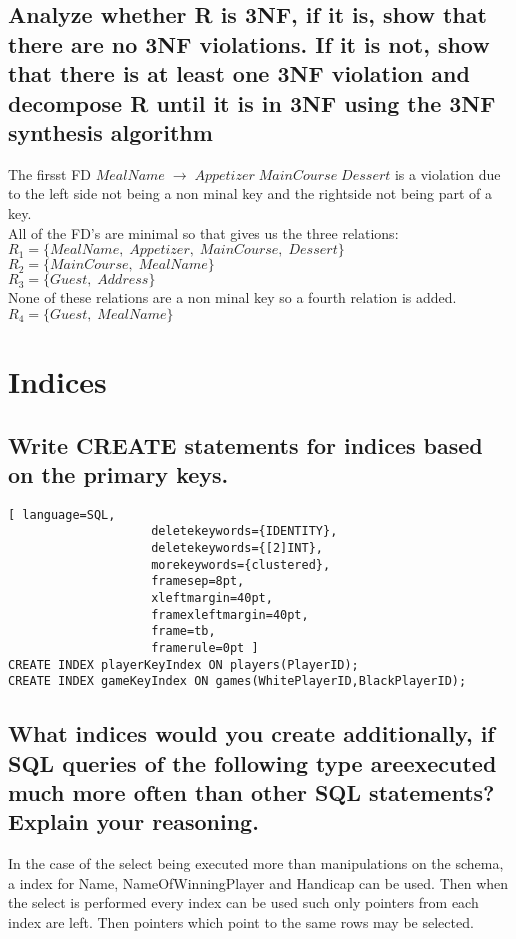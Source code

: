 \documentclass[12pt, a4paper]{article}
\newcommand{\beginSQL}{\begin{lstlisting}[ language=SQL,
                    deletekeywords={IDENTITY},
                    deletekeywords={[2]INT},
                    morekeywords={clustered},
                    framesep=8pt,
                    xleftmargin=40pt,
                    framexleftmargin=40pt,
                    frame=tb,
                    framerule=0pt ]}
\begin{document}
		\subsection{Analyze whether R is 3NF, if it is, show that there are no 3NF violations.  If it is not, show that there is at least one 3NF violation and decompose R until it is in 3NF using the 3NF synthesis algorithm}
			The firsst FD 
			$MealName\;\rightarrow\;Appetizer\;MainCourse\;Dessert$
			is a violation due to the left side not being a non minal key and the rightside not being part of a key.\\
			All of the FD's are minimal so that gives us the three relations:\\
			$R_1=\{MealName,\;Appetizer,\;MainCourse,\;Dessert\}$\\
			$R_2=\{MainCourse,\;MealName\}$\\
			$R_3=\{Guest,\;Address\}$\\
			None of these relations are a non minal key so a fourth relation is added.\\
			$R_4=\{Guest,\;MealName\}$
	\section{Indices}
		\subsection{Write CREATE statements for indices based on the primary keys.}
			\beginSQL
CREATE INDEX playerKeyIndex ON players(PlayerID);
CREATE INDEX gameKeyIndex ON games(WhitePlayerID,BlackPlayerID);\end{lstlisting}
		\subsection{What indices would you create additionally, if SQL queries of the following type areexecuted much more often than other SQL statements?  Explain your reasoning.}
			In the case of the select being executed more than manipulations on the schema, a index for Name, NameOfWinningPlayer and Handicap can be used. Then when the select is performed every index can be used such only pointers from each index are left. Then pointers which point to the same rows may be selected.
\end{document}
